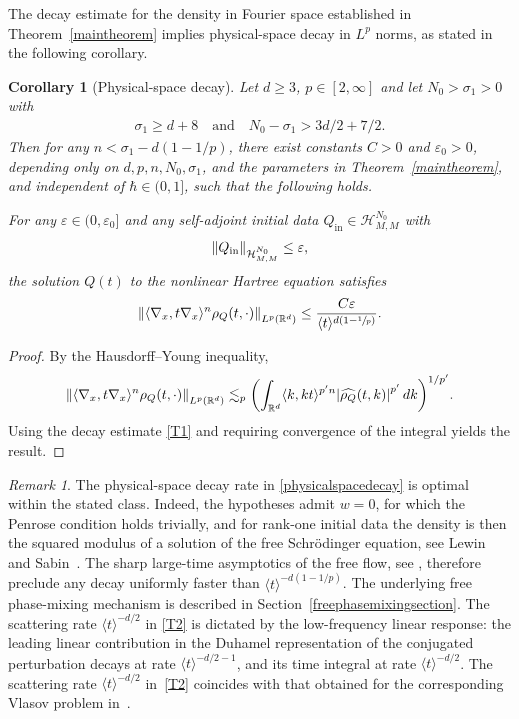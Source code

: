 \documentclass[JEP,XML,SOM,Unicode]{cedram}
\theoremstyle{plain}
\newtheorem{corollary}[theorem]{Corollary}
\theoremstyle{remark}
\newtheorem{remark}[theorem]{Remark}
\newcommand{\bbbr}[1]{\biggl(#1 \biggr)}
\newcommand{\jb}[1]{\langle#1\rangle}
\newcommand{\qaq}{\quad\text{and}\quad}
\newcommand{\ep}{\varepsilon}
\newcommand{\R}{\mathbb{R}}
\newcommand{\Qin}{Q_{\mathrm{in}}}
\begin{document}
The decay estimate for the density in Fourier space established in Theorem~\ref{maintheorem} implies physical-space decay in $L^p$ norms, as stated in the following corollary.
\begin{corollary}[Physical-space decay]
Let $d\geq 3$, $p\in[2,\infty]$ and let $N_0>\sigma_1>0$ with
\begin{align*}
\sigma_1\geq d+8\qaq N_0-\sigma_1>3d/2+7/2.
\end{align*}
Then for any $n<\sigma_1-d(1-1/p)$, there exist constants $C>0$ and $\ep_0>0$, depending only on $d,p,n,N_0,\sigma_1$, and the parameters in Theorem~\ref{maintheorem}, and independent of $\hbar\in(0,1]$, such that the following holds.

For any $\ep\in(0,\ep_0]$ and any self-adjoint initial data $\Qin\in\mathcal{H}^{N_0}_{M,M}$ with
\begin{align*}
\norm{Q_{\mathrm{in}}}_{\mathcal H^{N_0}_{M,M}}\leq\ep,
\end{align*}
the solution $Q(t)$ to the nonlinear Hartree equation satisfies
\begin{align}\label{physicalspacedecay}
\norm{\jb{\nabla_x,t\nabla_x}^n\rho_Q(t,\cdot)}_{L^p(\R^d)}\leq \frac{C\ep}{\jb{ t}^{d(1-\sfrac{1}{p})}}.
\end{align}
\end{corollary}
\begin{proof}
By the Hausdorff--Young inequality,
\begin{align*}
\norm{\jb{\nabla_x,t\nabla_x}^n\rho_Q(t,\cdot)}_{L^p(\R^d)}
\lesssim_p \bbbr{\int_{\R^d} \jb{k,kt}^{p'n} \abs{\widehat{\rho_Q}(t,k)}^{p'} \,dk}^{1/p'}.
\end{align*}
Using the decay estimate \eqref{T1} and requiring convergence of the integral yields the result.
\end{proof}

\begin{remark}\label{optimalityremark}
The physical-space decay rate in \eqref{physicalspacedecay} is optimal within the stated class. Indeed, the hypotheses admit $w=0$, for which the Penrose condition holds trivially, and for rank-one initial data the density is then the squared modulus of a solution of the free Schrödinger equation, see Lewin and Sabin~\cite{LewinSabinI2015}. The sharp large-time asymptotics of the free flow, see \eg \cite[Ch.\,2]{Cazenave2003}, therefore preclude any decay uniformly faster than $\jb{t}^{-d(1-1/p)}$. The underlying free phase-mixing mechanism is described in Section~\ref{freephasemixingsection}. The scattering rate $\jb{t}^{-d/2}$ in \eqref{T2} is dictated by the low-frequency linear response: the leading linear contribution in the Duhamel representation of the conjugated perturbation decays at rate $\jb{t}^{-d/2-1}$, and its time integral at rate $\jb{t}^{-d/2}$. The scattering rate $\jb{t}^{-d/2}$ in~\eqref{T2} coincides with that obtained for the corresponding Vlasov problem in~\cite{BedrossianMasmoudiMouhot2018}.
\end{remark}
\end{document}
